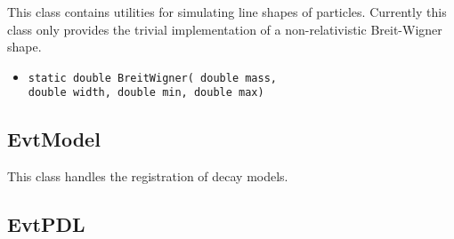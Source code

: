 This class contains utilities for simulating line shapes of particles.
Currently this class only provides the trivial implementation of a
non-relativistic Breit-Wigner shape.

\begin{itemize}
\item {\tt static double BreitWigner( double mass,}\\
      {\tt double width, double min, double max)}\\
\end{itemize}


\subsection{EvtModel}

This class handles the registration of decay models.



\subsection{EvtPDL}
\label{sect:evtpdl}

